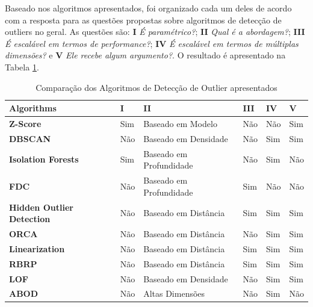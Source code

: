 \vspace{25pt}

Baseado nos algoritmos apresentados, foi organizado cada um deles de acordo com a resposta para as questões propostas sobre algoritmos de detecção de outliers no geral. As questões são: \textbf{I} \textit{É paramétrico?}; \textbf{II} \textit{Qual é a abordagem?}; \textbf{III} \textit{É escalável em termos de performance?}; \textbf{IV} \textit{É escalável em termos de múltiplas dimensões?} e \textbf{V} \textit{Ele recebe algum argumento?}. O resultado é apresentado na Tabela \ref{table:algorithms-comparison}.

\begin{table}[!h]
	\centering
	\begin{tabular}{|l|l|l|l|l|l|}
		\hline
		\textbf{Algorithms}               & \textbf{I} & \textbf{II}             & \textbf{III} & \textbf{IV} & \textbf{V} \\ \hline
		\textbf{Z-Score}                  & Sim        & Baseado em Modelo       & Não          & Não         & Sim        \\ \hline
		\textbf{DBSCAN}                   & Não        & Baseado em Densidade    & Não          & Sim         & Sim        \\ \hline
		\textbf{Isolation Forests}        & Sim        & Baseado em Profundidade & Não          & Sim         & Não        \\ \hline
		\textbf{FDC}                      & Não        & Baseado em Profundidade & Sim          & Não         & Não        \\ \hline
		\textbf{Hidden Outlier Detection} & Não        & Baseado em Distância    & Sim          & Sim         & Sim        \\ \hline
		\textbf{ORCA}                     & Não        & Baseado em Distância    & Não          & Sim         & Sim        \\ \hline
		\textbf{Linearization}            & Não        & Baseado em Distância    & Sim          & Sim         & Sim        \\ \hline
		\textbf{RBRP}                     & Não        & Baseado em Distância    & Sim          & Sim         & Sim        \\ \hline
		\textbf{LOF}                      & Não        & Baseado em Densidade    & Não          & Sim         & Sim        \\ \hline
		\textbf{ABOD}                     & Não        & Altas Dimensões         & Não          & Sim         & Não        \\ \hline
	\end{tabular}
	\caption{Comparação dos Algoritmos de Detecção de Outlier apresentados}
	\label{table:algorithms-comparison}
\end{table}

